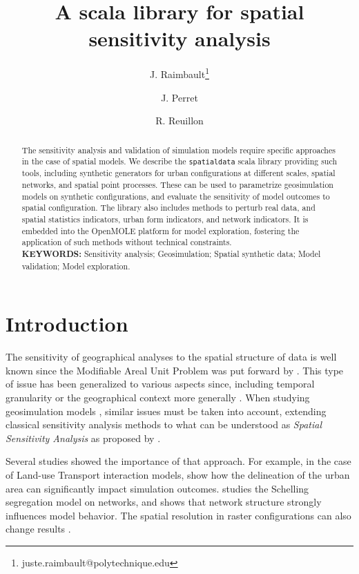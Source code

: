 \documentclass[11pt]{article}
\title{\vspace{-4cm}A scala library for spatial sensitivity analysis}
\author[1,2,3]{J. Raimbault\thanks{juste.raimbault@polytechnique.edu}}
\author[4,2]{J. Perret}
\author[2,3]{R. Reuillon}
\affil[1]{Center for Advanced Spatial Analysis, University College London}
\affil[2]{UPS CNRS 3611 ISC-PIF}
\affil[3]{UMR CNRS 8504 G{\'e}ographie-cit{\'e}s}
\affil[4]{LaSTIG STRUDEL, IGN, ENSG, Univ. Paris-Est}
\date{}
\begin{document}
\maketitle


\begin{abstract}
The sensitivity analysis and validation of simulation models require specific approaches in the case of spatial models. We describe the \texttt{spatialdata} scala library providing such tools, including synthetic generators for urban configurations at different scales, spatial networks, and spatial point processes. These can be used to parametrize geosimulation models on synthetic configurations, and evaluate the sensitivity of model outcomes to spatial configuration. The library also includes methods to perturb real data, and spatial statistics indicators, urban form indicators, and network indicators. It is embedded into the OpenMOLE platform for model exploration, fostering the application of such methods without technical constraints.
\medskip\\ {\bf KEYWORDS:} Sensitivity analysis; Geosimulation; Spatial synthetic data; Model validation; Model exploration.

\end{abstract}


\section{Introduction}


The sensitivity of geographical analyses to the spatial structure of data is well known since the Modifiable Areal Unit Problem was put forward by \cite{openshaw1984modifiable}. This type of issue has been generalized to various aspects since, including temporal granularity \citep{cheng2014modifiable} or the geographical context more generally \citep{kwan2012uncertain}. When studying geosimulation models \citep{benenson2004geosimulation}, similar issues must be taken into account, extending classical sensitivity analysis methods \citep{saltelli2004sensitivity} to what can be understood as \emph{Spatial Sensitivity Analysis} as proposed by \cite{raimbault2019space}.

Several studies showed the importance of that approach. For example, in the case of Land-use Transport interaction models, \cite{thomas2018city} show how the delineation of the urban area can significantly impact simulation outcomes. \cite{banos2012network} studies the Schelling segregation model on networks, and shows that network structure strongly influences model behavior. The spatial resolution in raster configurations can also change results \citep{singh2007schelling}.
\end{document}
